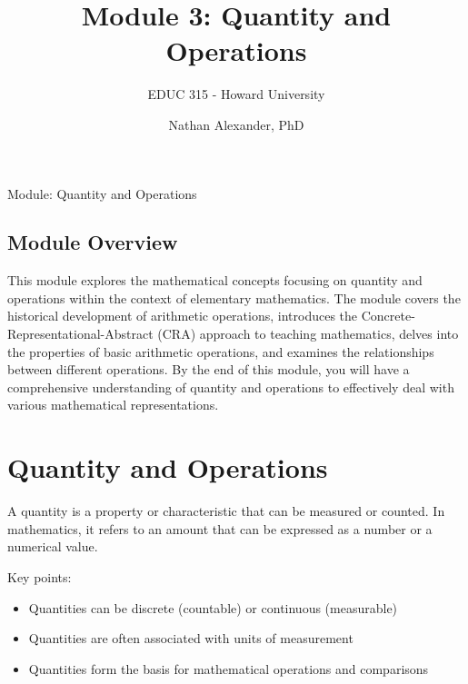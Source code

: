 \documentclass[
  letterpaper,
  DIV=11,
  numbers=noendperiod]{scrartcl}
\title{Module 3: Quantity and Operations}
\subtitle{EDUC 315 - Howard University}
\author{Nathan Alexander, PhD}
\date{}
\providecommand{\tightlist}{%
  \setlength{\itemsep}{0pt}\setlength{\parskip}{0pt}}\usepackage{longtable,booktabs,array}
\renewcommand*\contentsname{Table of contents}
\newcommand\contentsname{Table of contents}
\begin{document}
\maketitle

\renewcommand*\contentsname{Table of contents}
{
\hypersetup{linkcolor=}
\setcounter{tocdepth}{3}
\tableofcontents
}

Module: Quantity and Operations

\subsection{Module Overview}\label{module-overview}

This module explores the mathematical concepts focusing on quantity and
operations within the context of elementary mathematics. The module
covers the historical development of arithmetic operations, introduces
the Concrete-Representational-Abstract (CRA) approach to teaching
mathematics, delves into the properties of basic arithmetic operations,
and examines the relationships between different operations. By the end
of this module, you will have a comprehensive understanding of quantity
and operations to effectively deal with various mathematical
representations.

\section{Quantity and Operations}\label{quantity-and-operations}

\begin{tcolorbox}[enhanced jigsaw, rightrule=.15mm, toprule=.15mm, colbacktitle=quarto-callout-note-color!10!white, title={Quantity}, arc=.35mm, opacityback=0, left=2mm, toptitle=1mm, colback=white, breakable, coltitle=black, leftrule=.75mm, bottomtitle=1mm, titlerule=0mm, bottomrule=.15mm, opacitybacktitle=0.6, colframe=quarto-callout-note-color-frame]

A quantity is a property or characteristic that can be measured or
counted. In mathematics, it refers to an amount that can be expressed as
a number or a numerical value.

\end{tcolorbox}

Key points:

\begin{itemize}
\tightlist
\item
  Quantities can be discrete (countable) or continuous (measurable)
\item
  Quantities are often associated with units of measurement
\item
  Quantities form the basis for mathematical operations and comparisons
\end{itemize}
\end{document}
